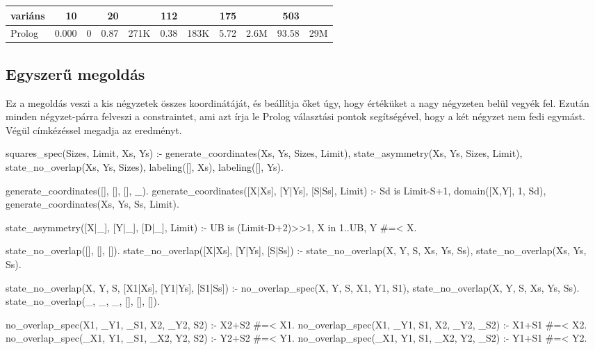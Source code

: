 \begin{center}
\begin{tabular}{|l|rr|rr|rr|rr|rr|}
\hline
variáns   & 10     &      &  20   &      & 112    &      & 175   &    & 503  &\\
\hline
Prolog          &  0.000 &     0&  0.87& 271K &  0.38 &  183K & 5.72 & 2.6M
&93.58 & 29M \\
\hline
\end{tabular}
\end{center}

\subsection{Egyszerű \clpfd megoldás}

Ez a megoldás veszi a kis négyzetek összes koordinátáját, és beállítja
őket úgy, hogy értéküket a nagy négyzeten belül vegyék fel. Ezután
minden négyzet-párra felveszi a  constraintet,
ami azt írja le Prolog választási pontok segítségével, hogy a két
négyzet nem fedi egymást. Végül címkézéssel megadja az eredményt.

\begin{prologcode}
squares_spec(Sizes, Limit, Xs, Ys) :-
        generate_coordinates(Xs, Ys, Sizes, Limit),
        state_asymmetry(Xs, Ys, Sizes, Limit),
        state_no_overlap(Xs, Ys, Sizes),
        labeling([], Xs), labeling([], Ys).

generate_coordinates([], [], [], _).
generate_coordinates([X|Xs], [Y|Ys], [S|Ss], Limit) :-
        Sd is Limit-S+1, domain([X,Y], 1, Sd),
        generate_coordinates(Xs, Ys, Ss, Limit).

state_asymmetry([X|_], [Y|_], [D|_], Limit) :-
        UB is (Limit-D+2)>>1, X in 1..UB, Y #=< X.

state_no_overlap([], [], []).
state_no_overlap([X|Xs], [Y|Ys], [S|Ss]) :-
        state_no_overlap(X, Y, S, Xs, Ys, Ss),
        state_no_overlap(Xs, Ys, Ss).

state_no_overlap(X, Y, S, [X1|Xs], [Y1|Ys], [S1|Ss]) :-
        no_overlap_spec(X, Y, S, X1, Y1, S1),
        state_no_overlap(X, Y, S, Xs, Ys, Ss).
state_no_overlap(_, _, _, [], [], []).

no_overlap_spec(X1, _Y1, _S1, X2, _Y2, S2) :-
        X2+S2 #=< X1.   %
no_overlap_spec(X1, _Y1, S1, X2, _Y2, _S2) :-
        X1+S1 #=< X2.   %
no_overlap_spec(_X1, Y1, _S1, _X2, Y2, S2) :-
        Y2+S2 #=< Y1.   %
no_overlap_spec(_X1, Y1, S1, _X2, Y2, _S2) :-
        Y1+S1 #=< Y2.   %
\end{prologcode}

